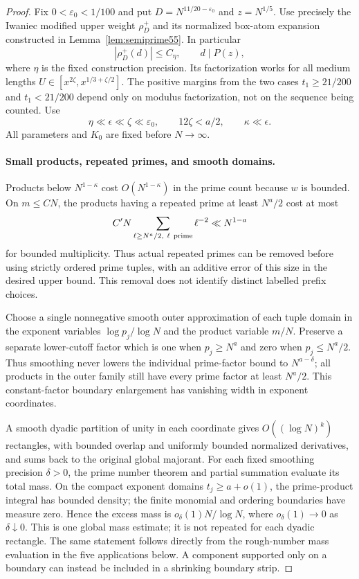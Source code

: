 \begin{proof}
Fix $0<\varepsilon_0<1/100$ and put
$D=N^{11/20-\varepsilon_0}$ and $z=N^{1/5}$.
Use precisely the Iwaniec modified upper weight $\rho_D^+$
and its normalized box-atom expansion constructed in
Lemma~\ref{lem:semiprime55}. In particular
\[
 |\rho_D^+(d)|\le C_\eta,\qquad d\mid P(z),
\]
where $\eta$ is the fixed construction precision.
Its factorization works for all medium lengths
$U\in[x^{2\zeta},x^{1/3+\zeta/2}]$.
The positive margins from the two cases
$t_1\ge21/200$ and $t_1<21/200$ depend only on modulus
factorization, not on the sequence being counted.
Use
\[
 \eta\ll\epsilon\ll\zeta\ll\varepsilon_0,\qquad
 12\zeta<a/2,\qquad \kappa\ll\epsilon .
\]
All parameters and $K_0$ are fixed before $N\to\infty$.

\paragraph{Small products, repeated primes, and smooth domains.}
Products below $N^{1-\kappa}$ cost
$O(N^{1-\kappa})$ in the prime count because $w$ is bounded.
On $m\le CN$, the products having a repeated prime at least
$N^a/2$ cost at most
\[
 C' N\sum_{\ell\ge N^a/2,\ \ell\ {\rm prime}}\ell^{-2}
       \ll N^{1-a}
\]
for bounded multiplicity. Thus actual repeated primes can be
removed before using strictly ordered prime tuples, with an
additive error of this size in the desired upper bound.
This removal does not identify distinct labelled prefix choices.

Choose a single nonnegative smooth outer approximation of each
tuple domain in the exponent variables
$\log p_j/\log N$ and the product variable $m/N$.
Preserve a separate lower-cutoff factor which is one when
$p_j\ge N^a$ and zero when $p_j\le N^a/2$.
Thus smoothing never lowers the individual prime-factor bound
to $N^{a-\delta}$; all products in the outer family still have
every prime factor at least $N^a/2$.
This constant-factor boundary enlargement has vanishing width
in exponent coordinates.

A smooth dyadic partition of unity in each coordinate gives
$O((\log N)^k)$ rectangles, with bounded overlap and uniformly
bounded normalized derivatives, and sums back to the original
global majorant. For each fixed smoothing precision $\delta>0$,
the prime number theorem and partial summation evaluate its total
mass. On the compact exponent domains $t_j\ge a+o(1)$, the
prime-product integral has bounded density; the finite monomial
and ordering boundaries have measure zero. Hence the excess
mass is $o_\delta(1)N/\log N$, where $o_\delta(1)\to0$
as $\delta\downarrow0$. This is one global mass estimate;
it is not repeated for each dyadic rectangle.
The same statement follows directly from the rough-number mass
evaluation in the five applications below.
A component supported only on a boundary can instead be included
in a shrinking boundary strip.


\end{proof}
